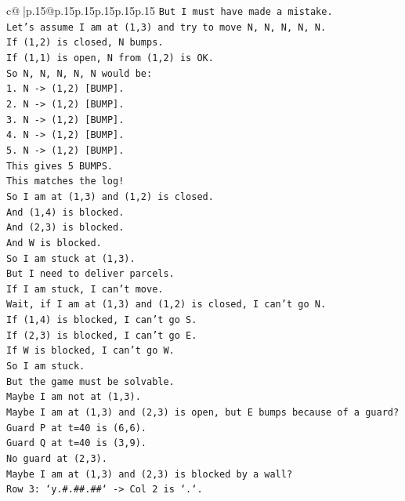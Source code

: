 \documentclass{article}
\begin{document}
{\begin{supertabular}{c@{$\;$}|p{.15\linewidth}@{}p{.15\linewidth}p{.15\linewidth}p{.15\linewidth}p{.15\linewidth}p{.15\linewidth}}
{{{\texttt{But I must have made a mistake.} \\
\texttt{Let's assume I am at (1,3) and try to move N, N, N, N, N.} \\
\texttt{If (1,2) is closed, N bumps.} \\
\texttt{If (1,1) is open, N from (1,2) is OK.} \\
\texttt{So N, N, N, N, N would be:} \\
\texttt{1. N {-}> (1,2) {[}BUMP{]}.} \\
\texttt{2. N {-}> (1,2) {[}BUMP{]}.} \\
\texttt{3. N {-}> (1,2) {[}BUMP{]}.} \\
\texttt{4. N {-}> (1,2) {[}BUMP{]}.} \\
\texttt{5. N {-}> (1,2) {[}BUMP{]}.} \\
\texttt{This gives 5 BUMPS.} \\
\texttt{This matches the log!} \\
\texttt{So I am at (1,3) and (1,2) is closed.} \\
\texttt{And (1,4) is blocked.} \\
\texttt{And (2,3) is blocked.} \\
\texttt{And W is blocked.} \\
\texttt{So I am stuck at (1,3).} \\
\texttt{But I need to deliver parcels.} \\
\texttt{If I am stuck, I can't move.} \\
\texttt{Wait, if I am at (1,3) and (1,2) is closed, I can't go N.} \\
\texttt{If (1,4) is blocked, I can't go S.} \\
\texttt{If (2,3) is blocked, I can't go E.} \\
\texttt{If W is blocked, I can't go W.} \\
\texttt{So I am stuck.} \\
\texttt{But the game must be solvable.} \\
\texttt{Maybe I am not at (1,3).} \\
\texttt{Maybe I am at (1,3) and (2,3) is open, but E bumps because of a guard?} \\
\texttt{Guard P at t=40 is (6,6).} \\
\texttt{Guard Q at t=40 is (3,9).} \\
\texttt{No guard at (2,3).} \\
\texttt{Maybe I am at (1,3) and (2,3) is blocked by a wall?} \\
\texttt{Row 3: `y.\#.\#\#.\#\#` {-}> Col 2 is `.`.} \\
}}}
\end{supertabular}}
\end{document}
